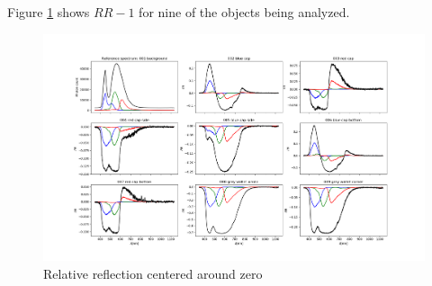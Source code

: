 Figure \ref{fig:relative_reflection_around_zero} shows $RR-1$ for nine of the objects being analyzed. 
\begin{landscape}
\begin{figure}[t]
    \centering
    \includegraphics[width=1\paperwidth]{Plots/relative_reflectance_around_zero_with_qe_color_response.png}
    \caption{Relative reflection centered around zero}
    \label{fig:relative_reflection_around_zero}
\end{figure}
\end{landscape}


